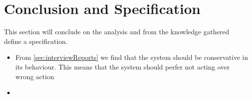 \section{Conclusion and Specification}
This section will conclude on the analysis and from the knowledge gathered define a specification.

\begin{itemize}
  \item From \cref{sec:interviewReports} we find that the system should be conservative in its behaviour. This means that the system should perfer not acting over wrong action
  \item 
\end{itemize}